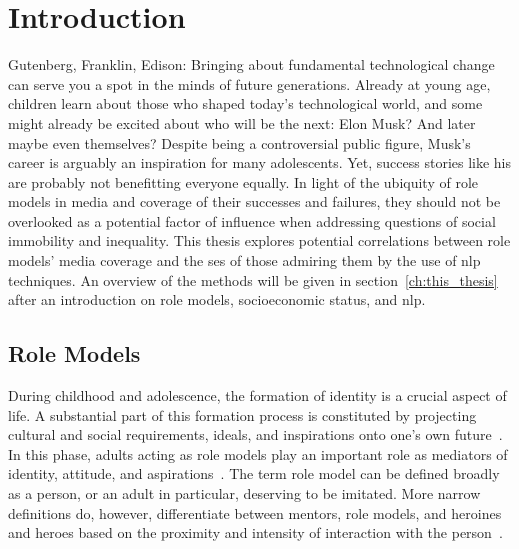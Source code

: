 \renewcommand{\imagepath}{../10-intro/img}

\chapter{Introduction}
Gutenberg, Franklin, Edison: Bringing about fundamental technological change can serve you a spot in the minds of future generations. Already at young age, children learn about those who shaped today's technological world, and some might already be excited about who will be the next: Elon Musk? And later maybe even themselves? Despite being a controversial public figure, Musk's career is arguably an inspiration for many adolescents. Yet, success stories like his are probably not benefitting everyone equally. In light of the ubiquity of role models in media and coverage of their successes and failures, they should not be overlooked as a potential factor of influence when addressing questions of social immobility and inequality. This thesis explores potential correlations between role models' media coverage and the \gls{ses} of those admiring them by the use of \gls{nlp} techniques. An overview of the methods will be given in section~\ref{ch:this_thesis} after an introduction on role models, socioeconomic status, and \gls{nlp}.

\section{Role Models}
During childhood and adolescence, the formation of identity is a crucial aspect of life. A substantial part of this formation process is constituted by projecting cultural and social requirements, ideals, and inspirations onto one's own future~\autocite{mcadams_psychology_2001}. In this phase, adults acting as role models play an important role as mediators of identity, attitude, and aspirations~\autocite{hurd_role_2011-1, morgenroth_how_2015}. The term role model can be defined broadly as a person, or an adult in particular, deserving to be imitated. More narrow definitions do, however, differentiate between mentors, role models, and heroines and heroes based on the proximity and intensity of interaction with the person~\autocite{pleiss_mentors_1995}.

